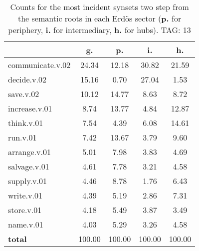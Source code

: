 \begin{table}[h!]
\begin{center}
\begin{tabular}{| l || c | c | c | c |}\hline
 & {\bf g.} & {\bf p.} & {\bf i.} & {\bf h.} \\\hline\hline
communicate.v.02 & 24.34  & 12.18  & 30.82  & 21.59 \\\hline
decide.v.02 & 15.16  & 0.70  & 27.04  & 1.53 \\\hline
save.v.02 & 10.12  & 14.77  & 8.63  & 8.72 \\\hline
increase.v.01 & 8.74  & 13.77  & 4.84  & 12.87 \\\hline
think.v.01 & 7.54  & 4.39  & 6.08  & 14.61 \\\hline
run.v.01 & 7.42  & 13.67  & 3.79  & 9.60 \\\hline
arrange.v.01 & 5.01  & 7.98  & 3.83  & 4.69 \\\hline
salvage.v.01 & 4.61  & 7.78  & 3.21  & 4.58 \\\hline
supply.v.01 & 4.46  & 8.78  & 1.76  & 6.43 \\\hline
write.v.01 & 4.39  & 5.19  & 2.86  & 7.31 \\\hline
store.v.01 & 4.18  & 5.49  & 3.87  & 3.49 \\\hline
name.v.01 & 4.03  & 5.29  & 3.26  & 4.58 \\\hline\hline
{{\bf total}} & 100.00  & 100.00  & 100.00  & 100.00 \\\hline
\end{tabular}
\caption{Counts for the most incident synsets two step from the semantic roots in each Erd\"os sector ({\bf p.} for periphery, {\bf i.} for intermediary, {\bf h.} for hubs). TAG: 13}
\end{center}
\end{table}